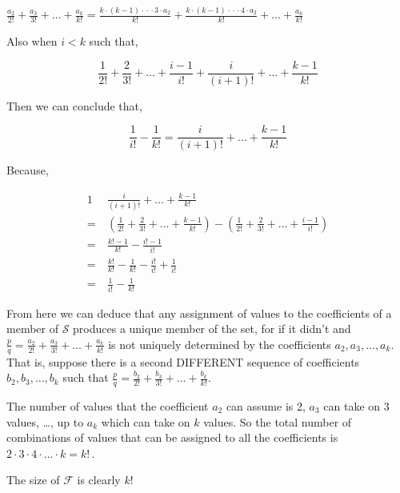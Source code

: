 \documentclass{article}
\begin{document}
\centerline{$\frac{a_2}{2!} + \frac{a_3}{3!} + \dots{} + \frac{a_k}{k!}
= \frac{k\cdot{}(k-1)\cdot{}\cdot{}\cdot{}3\cdot{}a_2}{k!}
+ \frac{k\cdot{}(k-1)\cdot{}\cdot{}\cdot{}4\cdot{}a_2}{k!}
+ \dots{}
+ \frac{a_k}{k!}$}

Also when $i<k$ such that,

\[\frac{1}{2!} + \frac{2}{3!}
+ \dots{}
+ \frac{i-1}{i!}
+ \frac{i}{(i+1)!}
+ \dots{}
+ \frac{k-1}{k!}
\]

Then we can conclude that,

\[\frac{1}{i!} - \frac{1}{k!}
= \frac{i}{(i+1)!}
+ \dots{}
+ \frac{k-1}{k!}
\]

Because,

\begin{alignat*}{1}
  &\frac{i}{(i+1)!} + \dots{} + \frac{k-1}{k!}\\
  =\  &(\frac{1}{2!} + \frac{2}{3!} + \dots{} + \frac{k-1}{k!})
  - (\frac{1}{2!} + \frac{2}{3!} + \dots{} + \frac{i-1}{i!})\\
  =\  &\frac{k!-1}{k!} - \frac{i!-1}{i!}\\
  =\  &\frac{k!}{k!} - \frac{1}{k!} - \frac{i!}{i!} + \frac{1}{i!}\\
  =\  &\frac{1}{i!} - \frac{1}{k!}
\end{alignat*}

From here we can deduce that any assignment
of values to the coefficients of a member of $\mathcal{S}$ produces a unique member
of the set, for if it didn't and
$\frac{p}{q} = \frac{a_2}{2!} + \frac{a_3}{3!} + \dots{} + \frac{a_k}{k!}$ is not uniquely 
determined by the coefficients
$a_2, a_3, \dots{}, a_k$. That is, suppose there is a second DIFFERENT sequence of coefficients
$b_2, b_3, \dots{}, b_k$ such that
$\frac{p}{q} = \frac{b_2}{2!} + \frac{b_3}{3!} + \dots{} + \frac{b_k}{k!}$.

The number of values that the coefficient $a_2$ can assume is 2, $a_3$ can take on 3 values, \dots{},
up to $a_k$ which can take on $k$ values. So the total number of combinations of values
that can be assigned to all the coefficients is $2\cdot{}3\cdot{}4\cdot\dots{}\cdot{}k = k!\,$.



The size of $\mathcal{F}$ is clearly $k!$
\end{document}
